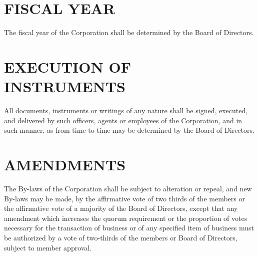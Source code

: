 \documentclass{article}
\begin{document}
\section{FISCAL YEAR}
The fiscal year of the Corporation shall be determined by the Board of Directors.
\section{EXECUTION OF INSTRUMENTS}
All documents, instruments or writings of any nature shall be signed, executed, and delivered by such officers, agents or employees of the Corporation, and in such manner, as from time to time may be determined by the Board of Directors.
\section{AMENDMENTS}
The By-laws of the Corporation shall be subject to alteration or repeal, and new By-laws may be made, by the affirmative vote of two thirds of the members or the affirmative vote of a majority of the Board of Directors, except that any amendment which increases the quorum requirement or the proportion of votes necessary for the transaction of business or of any specified item of business must be authorized by a vote of two-thirds of the members or Board of Directors, subject to member approval.
\end{document}
